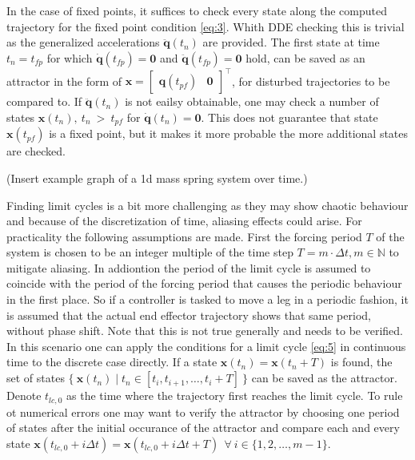 In the case of fixed points, it suffices to check every state along the computed trajectory for the fixed point condition \ref{eq:3}. Whith DDE checking this is trivial as the generalized accelerations $\ddot{\mathbf{q}}(t_n)$ are provided. 
The first state at time $t_n = t_{fp}$ for which $\dot{\mathbf{q}}(t_{fp}) = \mathbf{0}$ and $\ddot{\mathbf{q}}(t_{fp}) = \mathbf{0}$ hold, can be saved as an attractor in the form of $\mathbf{x} = \begin{bmatrix}\mathbf{q}(t_{pf})&\mathbf{0}\end{bmatrix}^\intercal$, for disturbed trajectories to be compared to. 
If $\ddot{\mathbf{q}}(t_n)$ is not eailsy obtainable, one may check a number of states $\mathbf{x}(t_n),\ t_n\ >\ t_{pf}$ for $\dot{\mathbf{q}}(t_n) = \mathbf{0}$. This does not guarantee that state $\mathbf{x}(t_{pf})$ is a fixed point, 
but it makes it more probable the more additional states are checked. 

(Insert example graph of a 1d mass spring system over time.) 

Finding limit cycles is a bit more challenging as they may show chaotic behaviour and because of the discretization of time, aliasing effects could arise. For practicality the following assumptions are made. 
First the forcing period $T$ of the system is chosen to be an integer multiple of the time step $T = m\cdot \Delta t, m \in \mathbb{N}$ to mitigate aliasing. In addiontion the period of the limit cycle is assumed to coincide with the period of the forcing period that causes the periodic behaviour in the first place. So if a controller is tasked to move a leg in a periodic fashion, it is assumed that the actual end effector trajectory shows that same period, without phase shift. Note that this is not true generally and needs to be verified. 
In this scenario one can apply the conditions for a limit cycle \ref{eq:5} in continuous time to the discrete case directly.
If a state $\mathbf{x}(t_n) = \mathbf{x}(t_n+T)$ is found, the set of states $\{\ \mathbf{x}(t_n) \mid t_n \in [t_i,t_{i+1},\ldots,t_i+T]\ \}$ can be saved as the attractor. Denote $t_{lc,0}$ as the time where the trajectory first reaches the limit cycle. To rule ot numerical errors one may want to verify the attractor by choosing one period of states after the initial occurance of the attractor and compare each and every state $\mathbf{x}(t_{lc,0}+i\Delta t) = \mathbf{x}(t_{lc,0}+i\Delta t+T)\ \ \forall\ i \in \{1,2,\ldots, m-1\}$.

